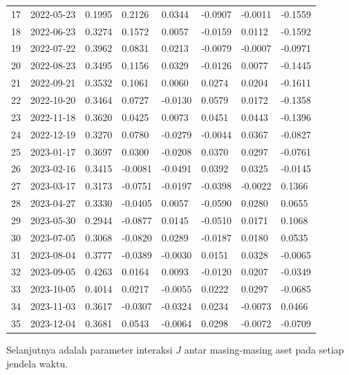 {\begin{longtable}{llllllll}
17 & 2022-05-23 & 0.1995 & 0.2126 & 0.0344 & -0.0907 & -0.0011 & -0.1559 \\
18 & 2022-06-23 & 0.3274 & 0.1572 & 0.0057 & -0.0159 & 0.0112 & -0.1592 \\
19 & 2022-07-22 & 0.3962 & 0.0831 & 0.0213 & -0.0079 & -0.0007 & -0.0971 \\
20 & 2022-08-23 & 0.3495 & 0.1156 & 0.0329 & -0.0126 & 0.0077 & -0.1445 \\
21 & 2022-09-21 & 0.3532 & 0.1061 & 0.0060 & 0.0274 & 0.0204 & -0.1611 \\
22 & 2022-10-20 & 0.3464 & 0.0727 & -0.0130 & 0.0579 & 0.0172 & -0.1358 \\
23 & 2022-11-18 & 0.3620 & 0.0425 & 0.0073 & 0.0451 & 0.0443 & -0.1396 \\
24 & 2022-12-19 & 0.3270 & 0.0780 & -0.0279 & -0.0044 & 0.0367 & -0.0827 \\
25 & 2023-01-17 & 0.3697 & 0.0300 & -0.0208 & 0.0370 & 0.0297 & -0.0761 \\
26 & 2023-02-16 & 0.3415 & -0.0081 & -0.0491 & 0.0392 & 0.0325 & -0.0145 \\
27 & 2023-03-17 & 0.3173 & -0.0751 & -0.0197 & -0.0398 & -0.0022 & 0.1366 \\
28 & 2023-04-27 & 0.3330 & -0.0405 & 0.0057 & -0.0590 & 0.0280 & 0.0655 \\
29 & 2023-05-30 & 0.2944 & -0.0877 & 0.0145 & -0.0510 & 0.0171 & 0.1068 \\
30 & 2023-07-05 & 0.3068 & -0.0820 & 0.0289 & -0.0187 & 0.0180 & 0.0535 \\
31 & 2023-08-04 & 0.3777 & -0.0389 & -0.0030 & 0.0151 & 0.0328 & -0.0065 \\
32 & 2023-09-05 & 0.4263 & 0.0164 & 0.0093 & -0.0120 & 0.0207 & -0.0349 \\
33 & 2023-10-05 & 0.4014 & 0.0217 & -0.0055 & 0.0222 & 0.0297 & -0.0685 \\
34 & 2023-11-03 & 0.3617 & -0.0307 & -0.0324 & 0.0234 & -0.0073 & 0.0466 \\
35 & 2023-12-04 & 0.3681 & 0.0543 & -0.0064 & 0.0298 & -0.0072 & -0.0709 \\
\end{longtable}
}

Selanjutnya adalah parameter interaksi $J$ antar masing-masing aset pada setiap jendela waktu.

